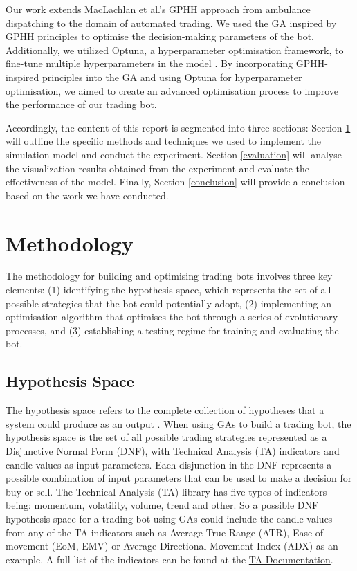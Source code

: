 \documentclass{IEEEtran}
\begin{document}
Our work extends MacLachlan et al.'s GPHH approach from ambulance dispatching to the domain of automated trading. We used the GA inspired by GPHH principles to optimise the decision-making parameters of the bot. Additionally, we utilized Optuna, a hyperparameter optimisation framework, to fine-tune multiple hyperparameters in the model \cite{optuna}. By incorporating GPHH-inspired principles into the GA and using Optuna for hyperparameter optimisation, we aimed to create an advanced optimisation process to improve the performance of our trading bot.

Accordingly, the content of this report is segmented into three sections: Section \ref{methodology} will outline the specific methods and techniques we used to implement the simulation model and conduct the experiment. Section \ref{evaluation} will analyse the visualization results obtained from the experiment and evaluate the effectiveness of the model. Finally, Section \ref{conclusion} will provide a conclusion based on the work we have conducted.

\section{Methodology} \label{methodology}
The methodology for building and optimising trading bots involves three key elements: (1) identifying the hypothesis space, which represents the set of all possible strategies that the bot could potentially adopt, (2) implementing an optimisation algorithm that optimises the bot through a series of evolutionary processes, and (3) establishing a testing regime for training and evaluating the bot.

\subsection{Hypothesis Space} \label{hypo}
The hypothesis space refers to the complete collection of hypotheses that a system could produce as an output \cite{blockeel2011hypothesis}. When using GAs to build a trading bot, the hypothesis space is the set of all possible trading strategies represented as a Disjunctive Normal Form (DNF), with Technical Analysis (TA) indicators and candle values as input parameters. Each disjunction in the DNF represents a possible combination of input parameters that can be used to make a decision for buy or sell. The Technical Analysis (TA) library has five types of indicators being: momentum, volatility, volume, trend and other. So a possible DNF hypothesis space for a trading bot using GAs could include the candle values from any of the TA indicators such as Average True Range (ATR), Ease of movement (EoM, EMV) or Average Directional Movement Index (ADX) as an example. A full list of the indicators can be found at the \href{https://technical-analysis-library-in-python.readthedocs.io}{TA Documentation}.
\end{document}
